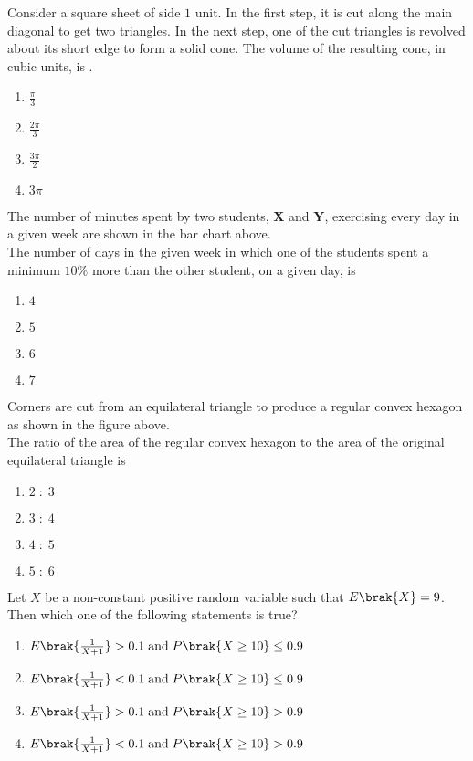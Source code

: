 \item Consider a square sheet of side $1$ unit. In the first step, it is cut along the main diagonal to get two triangles. In the next step, one of the cut triangles is revolved about its short edge to form a solid cone. The volume of the resulting cone, in cubic units, is \underline{\hspace{2cm}}.
\begin{enumerate}
    \item $\frac{\pi}{3}$
    \item $\frac{2\pi}{3}$
    \item $\frac{3\pi}{2}$
    \item $3\pi$
\end{enumerate}
\item 

The number of minutes spent by two students, \textbf{X} and \textbf{Y}, exercising every day in a given week are shown in the bar chart above.\\ The number of days in the given week in which one of the students spent a minimum $10\%$ more than the other student, on a given day, is
\begin{enumerate}
    \item $4$
    \item $5$
    \item $6$
    \item $7$
\end{enumerate}
\item 
Corners are cut from an equilateral triangle to produce a regular convex hexagon as shown in the figure above.\\ 

The ratio of the area of the regular convex hexagon to the area of the original equilateral triangle is
\begin{enumerate}
    \item $2\;:\;3$
    \item $3\;:\;4$
    \item $4\;:\;5$
    \item $5\;:\;6$
\end{enumerate}
\item Let $X$ be a non-constant positive random variable such that $E\brak{X}=9$. Then which one of the following statements is true?
\begin{enumerate}
    \item $E\brak{\frac{1}{X+1}}>0.1 \; \text{and} \; P\brak{X\geq10}\leq0.9$
    \item $E\brak{\frac{1}{X+1}}<0.1 \; \text{and} \; P\brak{X\geq10}\leq0.9$
    \item $E\brak{\frac{1}{X+1}}>0.1 \; \text{and} \; P\brak{X\geq10}>0.9$
    \item $E\brak{\frac{1}{X+1}}<0.1 \; \text{and} \; P\brak{X\geq10}>0.9$
\end{enumerate}
